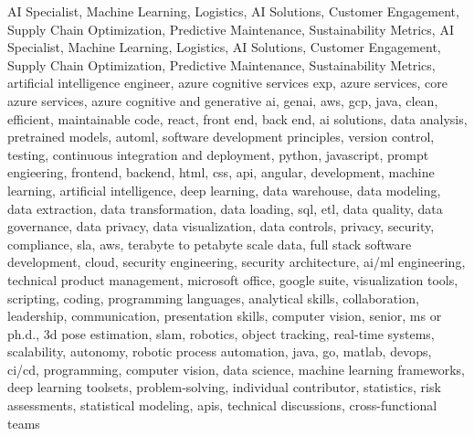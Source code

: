 \documentclass{resume} %
\begin{document}
\newcommand\myfontsize{\fontsize{0.1pt}{0.1pt}\selectfont} \myfontsize \color{white}
AI Specialist, Machine Learning, Logistics, AI Solutions, Customer Engagement, Supply Chain Optimization, Predictive Maintenance, Sustainability Metrics, AI Specialist, Machine Learning, Logistics, AI Solutions, Customer Engagement, Supply Chain Optimization, Predictive Maintenance, Sustainability Metrics, {artificial intelligence engineer, azure cognitive services exp, azure services, core azure services, azure cognitive and generative ai, genai, aws,  gcp, java, clean, efficient, maintainable code, react, front end, back end, ai solutions, data analysis, pretrained models, automl, software development principles, version control, testing, continuous integration and deployment, python, javascript, prompt engieering, frontend, backend, html, css, api, angular, development, machine learning, artificial intelligence, deep learning, data warehouse, data modeling, data extraction, data transformation, data loading, sql, etl, data quality, data governance, data privacy, data visualization, data controls, privacy, security, compliance, sla, aws, terabyte to petabyte scale data, full stack software development, cloud, security engineering, security architecture, ai/ml engineering, technical product management, microsoft office, google suite, visualization tools, scripting, coding, programming languages, analytical skills, collaboration, leadership, communication, presentation skills, computer vision, senior, ms or ph.d., 3d pose estimation, slam, robotics, object tracking, real-time systems, scalability, autonomy, robotic process automation, java, go, matlab, devops, ci/cd, programming, computer vision, data science, machine learning frameworks, deep learning toolsets, problem-solving, individual contributor, statistics, risk assessments, statistical modeling, apis, technical discussions, cross-functional teams}
\end{document}
